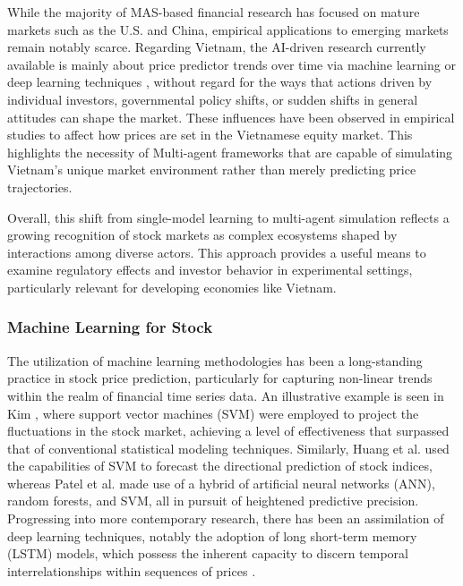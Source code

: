 \documentclass{ieeeaccess}
\begin{document}
While the majority of MAS-based financial research has focused on mature markets such as the U.S. and China, empirical applications to emerging markets remain notably scarce. Regarding Vietnam, the AI-driven research currently available is mainly about price predictor trends over time via machine learning or deep learning techniques \cite{tran2020forecasting,pham2023lstm}, without regard for the ways that actions driven by individual investors, governmental policy shifts, or sudden shifts in general attitudes can shape the market. These influences have been observed in empirical studies to affect how prices are set in the Vietnamese equity market. This highlights the necessity of Multi-agent frameworks that are capable of simulating Vietnam’s unique market environment rather than merely predicting price trajectories. 

Overall, this shift from single-model learning to multi-agent simulation reflects a growing recognition of stock markets as complex ecosystems shaped by interactions among diverse actors. This approach provides a useful means to examine regulatory effects and investor behavior in experimental settings, particularly relevant for developing economies like Vietnam.

\subsubsection{Machine Learning for Stock}
The utilization of machine learning methodologies has been a long-standing practice in stock price prediction, particularly for capturing non-linear trends within the realm of financial time series data. An illustrative example is seen in Kim \cite{kim2003}, where support vector machines (SVM) were employed to project the fluctuations in the stock market, achieving a level of effectiveness that surpassed that of conventional statistical modeling techniques. Similarly, Huang et al. \cite{huang2005} used the capabilities of SVM to forecast the directional prediction of stock indices, whereas Patel et al. \cite{patel2015} made use of a hybrid of artificial neural networks (ANN), random forests, and SVM, all in pursuit of heightened predictive precision. Progressing into more contemporary research, there has been an assimilation of deep learning techniques, notably the adoption of long short-term memory (LSTM) models, which possess the inherent capacity to discern temporal interrelationships within sequences of prices \cite{fischer2018,chen2015}.
\end{document}
